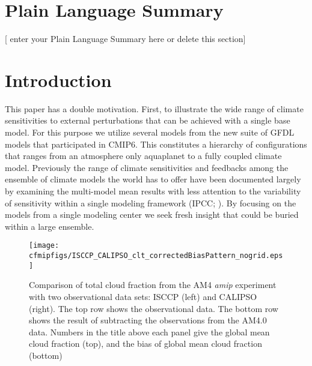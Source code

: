 \documentclass[draft]{agujournal2019}
\begin{document}
\section*{Plain Language Summary}
[ enter your Plain Language Summary here or delete this section]


\section{Introduction}

 

This paper has a double motivation.  First, to illustrate the wide range of climate sensitivities to external perturbations 
that can be achieved with a single base model.  For this purpose we utilize several models from the new suite of GFDL 
models that participated in CMIP6.  This constitutes a hierarchy of configurations that ranges from an atmosphere only 
aquaplanet to a fully coupled 
climate model.  Previously the range of climate sensitivities and feedbacks among the ensemble of climate models 
the world has to offer have been documented largely by examining the multi-model mean results with less attention to 
the variability of sensitivity within a single modeling framework (IPCC; ).  By 
focusing on the models from a single modeling center we seek fresh insight that could be buried within a large ensemble.

\begin{figure}
  \centering
  \texttt{[image: cfmipfigs/ISCCP\_CALIPSO\_clt\_correctedBiasPattern\_nogrid.eps]}
  \caption{Comparison of total cloud fraction from the AM4 \textit{amip} experiment with two observational 
  data sets: ISCCP (left) and CALIPSO (right).  The top row shows the observational data.  The bottom row
  shows the result of subtracting the observations from the AM4.0 data.  Numbers in the title above each 
  panel give the global mean cloud fraction (top), and the bias of global mean cloud fraction (bottom)}
  \label{fig:clt_isccp_calipso}
\end{figure}
\end{document}
